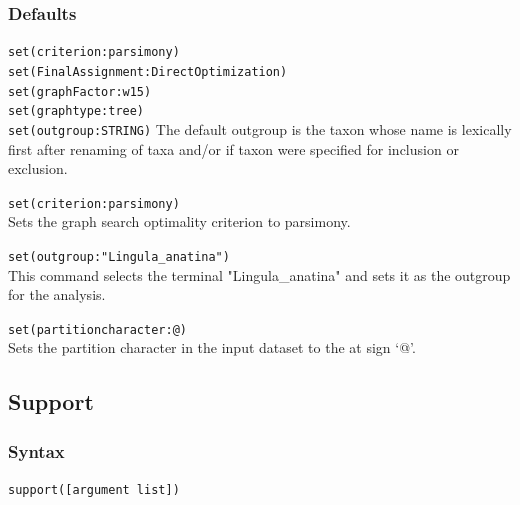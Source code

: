 	\subsubsection{Defaults} 
		\texttt{set(criterion:parsimony)}\\
		\texttt{set(FinalAssignment:DirectOptimization)} \\
		\texttt{set(graphFactor:w15)} \\
		\texttt{set(graphtype:tree)}\\
		\texttt{set(outgroup:STRING)} The default outgroup is the taxon whose name is 
		lexically first after renaming of taxa and/or if taxon were specified for inclusion or
		exclusion. 
		
		
	\begin{example}
		\item{\texttt{set(criterion:parsimony)}\\Sets the graph search optimality criterion to 
		parsimony.}

		\item{\texttt{set(outgroup:"Lingula\_anatina")}\\This command selects the terminal 
		"Lingula\_anatina" and sets it as the outgroup for the analysis.}
		
		\item{\texttt{set(partitioncharacter:@)}\\Sets the partition character in the input dataset 
		to the at sign `@'.}
		
	\end{example}

\subsection{Support}
\label{subsec:support}
	\subsubsection{Syntax}
		\texttt{support([argument list])}
		
